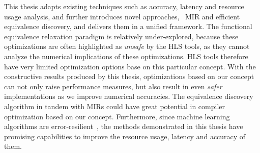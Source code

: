 This thesis adapts existing techniques such as accuracy, latency and resource
usage analysis, and further introduces novel approaches, \eg~MIR and efficient
equivalence discovery, and delivers them in a unified framework.  The
functional equivalence relaxation paradigm is relatively under-explored,
because these optimizations are often highlighted as \emph{unsafe} by the
HLS tools, as they cannot analyze the numerical implications of these
optimizations.  HLS tools therefore have very limited optimization options
base on this particular concept.  With the constructive results produced
by this thesis, optimizations based on our concept can not only raise
performance measures, but also result in even \emph{safer} implementations
as we improve numerical accuracies.  The equivalence discovery algorithm
in tandem with MIRs could have great potential in compiler optimization
based on our concept.  Furthermore, since machine learning algorithms are
error-resilient~\cite{lesser11, kim09, holt91, zhu03}, the methods demonstrated
in this thesis have promising capabilities to improve the resource usage,
latency and accuracy of them.

